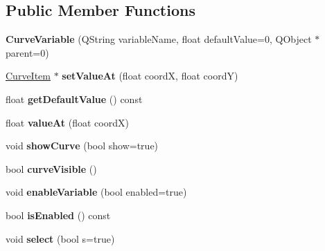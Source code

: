 \subsection*{\-Public \-Member \-Functions}
\begin{DoxyCompactItemize}
\item 
\hypertarget{class_curve_variable_a0ded4fcea53d6fd2ea4948a7808f7cd7}{
{\bfseries \-Curve\-Variable} (\-Q\-String variable\-Name, float default\-Value=0, \-Q\-Object $\ast$parent=0)}
\label{class_curve_variable_a0ded4fcea53d6fd2ea4948a7808f7cd7}

\item 
\hypertarget{class_curve_variable_ac38422a6af3dce73e7d91166dd349655}{
\hyperlink{class_curve_item}{\-Curve\-Item} $\ast$ {\bfseries set\-Value\-At} (float coord\-X, float coord\-Y)}
\label{class_curve_variable_ac38422a6af3dce73e7d91166dd349655}

\item 
\hypertarget{class_curve_variable_a96e33332616d9892017b51a4d15dc29b}{
float {\bfseries get\-Default\-Value} () const }
\label{class_curve_variable_a96e33332616d9892017b51a4d15dc29b}

\item 
\hypertarget{class_curve_variable_a53b371d18f16baa06bbee70856c27448}{
float {\bfseries value\-At} (float coord\-X)}
\label{class_curve_variable_a53b371d18f16baa06bbee70856c27448}

\item 
\hypertarget{class_curve_variable_ac78e974f3b6a9201e9aa62dea956ca18}{
void {\bfseries show\-Curve} (bool show=true)}
\label{class_curve_variable_ac78e974f3b6a9201e9aa62dea956ca18}

\item 
\hypertarget{class_curve_variable_a3b729c971c0ba34747d55a33a344bb98}{
bool {\bfseries curve\-Visible} ()}
\label{class_curve_variable_a3b729c971c0ba34747d55a33a344bb98}

\item 
\hypertarget{class_curve_variable_a47d678711fb47633bb9057cbb2fa56fa}{
void {\bfseries enable\-Variable} (bool enabled=true)}
\label{class_curve_variable_a47d678711fb47633bb9057cbb2fa56fa}

\item 
\hypertarget{class_curve_variable_a6e22f97d917bf8b8c42a28af23fac927}{
bool {\bfseries is\-Enabled} () const }
\label{class_curve_variable_a6e22f97d917bf8b8c42a28af23fac927}

\item 
\hypertarget{class_curve_variable_af8bb6a85182ced2c546ae6c52e3869f7}{
void {\bfseries select} (bool s=true)}
\label{class_curve_variable_af8bb6a85182ced2c546ae6c52e3869f7}


\end{DoxyCompactItemize}
